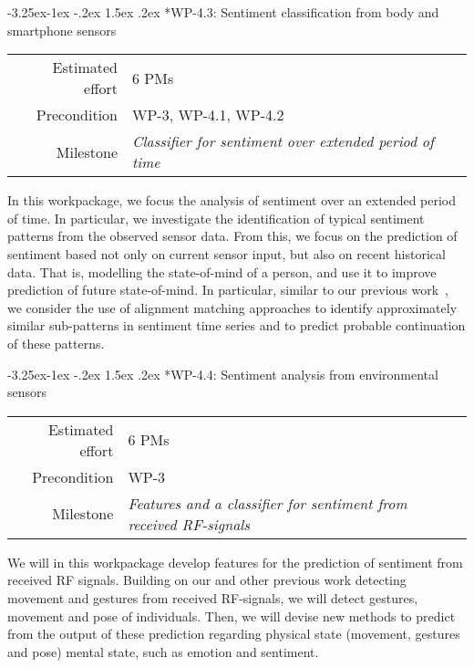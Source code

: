 \documentclass[12pt]{article}
\makeatletter
\newcommand{\kobyc}[1]{\begin{center}\fbox{\parbox{3in}{{\textcolor{green}{K: #1}}}}\end{center}}
\renewcommand\paragraph{\@startsection{paragraph}{4}{\z@}%
  {-3.25ex\@plus -1ex \@minus -.2ex}%
  {1.5ex \@plus .2ex}%
  {\normalfont\normalsize\bfseries}}
\makeatother
\begin{document}
\paragraph*{WP-4.3: Sentiment classification from body and smartphone sensors}
\begin{tabular}{rl}
 Estimated effort& 6 PMs\\
 Precondition & WP-3, WP-4.1, WP-4.2\\
 Milestone & \begin{minipage}[t]{12.2cm}
\textit{Classifier for sentiment over extended period of time}\vspace{.2cm}
             \end{minipage}
\end{tabular}

\noindent
In this workpackage, we focus the analysis of sentiment over an extended period of time. 
In particular, we investigate the identification of typical sentiment patterns from the observed sensor data.
From this, we focus on the prediction of sentiment based not only on current sensor input, but also on recent historical data. 
That is, modelling the state-of-mind of a person, and use it to improve prediction of future state-of-mind. 
In particular, similar to our previous work~\cite{4026,4027}, we consider the use of alignment matching approaches to identify approximately similar sub-patterns in sentiment time series and to predict probable continuation of these patterns.


\paragraph*{WP-4.4: Sentiment analysis from environmental sensors}
\begin{tabular}{rl}
 Estimated effort& 6 PMs\\
 Precondition & WP-3\\
 Milestone & \begin{minipage}[t]{12.2cm}
\textit{Features and a classifier for sentiment from received RF-signals}\vspace{.2cm}
             \end{minipage}
\end{tabular}

\noindent
We will in this workpackage develop features for the prediction of sentiment from received RF signals. 
Building on our and other previous work detecting movement and gestures from received RF-signals, we will detect gestures, movement and pose of individuals. 
Then, we will devise new methods to predict from the output of these prediction regarding physical state (movement, gestures and pose) mental state, such as emotion and sentiment. 
\end{document}
